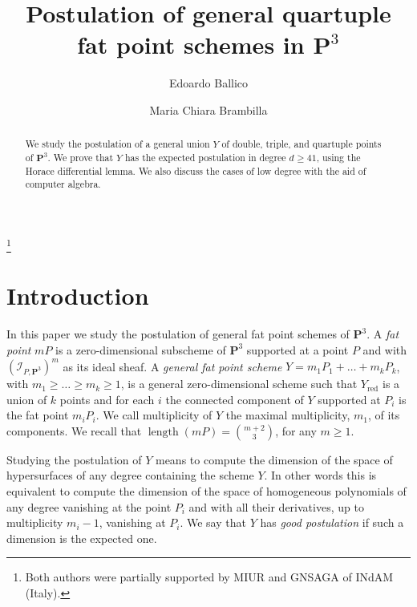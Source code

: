 \documentclass{amsart}
\date{}
\theoremstyle{plain}
\theoremstyle{definition}
\begin{document}
\title[Quartuple points]{Postulation of general quartuple \\
fat point schemes in $\mathbf{P}^3$}

\author{Edoardo Ballico}
\address{Dept. of Mathematics\\
 University of Trento\\
38050 Povo (TN), Italy}

\author{Maria Chiara Brambilla}
\address{Dept. of Mathematics ``G.~Castelnuovo'', University of Rome
  ``La Sapienza", Piazzale Aldo Moro 2, 00185, Rome, Italy}

\thanks{Both authors were partially supported by MIUR and GNSAGA of
  INdAM (Italy).}

\maketitle

\begin{abstract}
We study the postulation of a general union $Y$ of double, triple, and quartuple points of ${\mathbf P}^3$.
We prove that $Y$ has the expected postulation in degree $d\ge 41$, using the Horace differential
lemma. We also discuss the cases of low degree with the aid of computer algebra.
\end{abstract}

\section{Introduction}

In this paper we study the postulation of general fat point
schemes of ${\mathbf P}^3$. A {\em fat point} $mP$ is a zero-dimensional
subscheme of ${\mathbf P}^3$ supported at a point $P$ and with $({\mathcal
{I}}_{P,{\mathbf P}^3})^m$ as its ideal sheaf. A {\em general fat point
scheme} $Y=m_1P_1+\ldots+m_kP_k$, with $m_1\ge\ldots\ge m_k\ge1$,
is a general zero-dimensional scheme such that $Y_{\textrm{red}}$
is a union of $k$ points and for each $i$ the connected component
of $Y$ supported at $P_i$ is the fat point $m_iP_i$. We call
multiplicity of $Y$ the maximal multiplicity, $m_1$, of its
components. We recall that $\operatorname{length}(mP)={{m+2}\choose{3}}$, for any
$m\ge1$.

Studying the postulation of $Y$ means to compute the dimension of the space
of hypersurfaces of any degree containing the scheme $Y$. In other
words this is equivalent to
compute the dimension of the space of homogeneous polynomials of any degree
vanishing at the point $P_i$ and with all their derivatives,
up to multiplicity $m_i-1$, vanishing at $P_i$.
We say that $Y$ has {\em good postulation} if such a dimension is the expected one.
\end{document}
